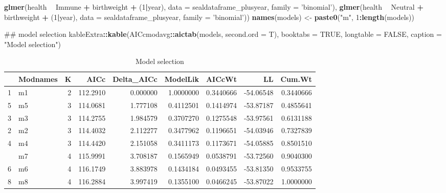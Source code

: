 \documentclass[]{article}
\newenvironment{Shaded}{\begin{snugshade}}{\end{snugshade}}
\newcommand{\KeywordTok}[1]{\textcolor[rgb]{0.13,0.29,0.53}{\textbf{#1}}}
\newcommand{\DataTypeTok}[1]{\textcolor[rgb]{0.13,0.29,0.53}{#1}}
\newcommand{\DecValTok}[1]{\textcolor[rgb]{0.00,0.00,0.81}{#1}}
\newcommand{\StringTok}[1]{\textcolor[rgb]{0.31,0.60,0.02}{#1}}
\newcommand{\OtherTok}[1]{\textcolor[rgb]{0.56,0.35,0.01}{#1}}
\newcommand{\OperatorTok}[1]{\textcolor[rgb]{0.81,0.36,0.00}{\textbf{#1}}}
\newcommand{\NormalTok}[1]{#1}
\begin{document}
\begin{Shaded}
\begin{Highlighting}[]
  \KeywordTok{glmer}\NormalTok{(health }\OperatorTok{~}\StringTok{  }\NormalTok{Immune }\OperatorTok{+}\StringTok{ }\NormalTok{birthweight }\OperatorTok{+}\StringTok{ }\NormalTok{(}\DecValTok{1}\OperatorTok{|}\NormalTok{year), }\DataTypeTok{data =}\NormalTok{ sealdataframe_plusyear, }\DataTypeTok{family =} \StringTok{'binomial'}\NormalTok{),}
  \KeywordTok{glmer}\NormalTok{(health }\OperatorTok{~}\StringTok{  }\NormalTok{Neutral }\OperatorTok{+}\StringTok{ }\NormalTok{birthweight }\OperatorTok{+}\StringTok{ }\NormalTok{(}\DecValTok{1}\OperatorTok{|}\NormalTok{year), }\DataTypeTok{data =}\NormalTok{ sealdataframe_plusyear, }\DataTypeTok{family =} \StringTok{'binomial'}\NormalTok{)) }
\KeywordTok{names}\NormalTok{(models) <-}\StringTok{ }\KeywordTok{paste0}\NormalTok{(}\StringTok{"m"}\NormalTok{, }\DecValTok{1}\OperatorTok{:}\KeywordTok{length}\NormalTok{(models))}

\NormalTok{## model selection}
\NormalTok{kableExtra}\OperatorTok{::}\KeywordTok{kable}\NormalTok{(AICcmodavg}\OperatorTok{::}\KeywordTok{aictab}\NormalTok{(models, }\DataTypeTok{second.ord =}\NormalTok{ T), }\DataTypeTok{booktabs =} \OtherTok{TRUE}\NormalTok{,}
                  \DataTypeTok{longtable =} \OtherTok{FALSE}\NormalTok{, }\DataTypeTok{caption =} \StringTok{"Model selection"}\NormalTok{)}
\end{Highlighting}
\end{Shaded}

\begin{table}

\caption{\label{tab:AIC models}Model selection}
\centering
\begin{tabular}[t]{llrrrrrrr}
\toprule
  & Modnames & K & AICc & Delta\_AICc & ModelLik & AICcWt & LL & Cum.Wt\\
\midrule
1 & m1 & 2 & 112.2910 & 0.000000 & 1.0000000 & 0.3440666 & -54.06548 & 0.3440666\\
5 & m5 & 3 & 114.0681 & 1.777108 & 0.4112501 & 0.1414974 & -53.87187 & 0.4855641\\
3 & m3 & 3 & 114.2755 & 1.984579 & 0.3707270 & 0.1275548 & -53.97561 & 0.6131188\\
2 & m2 & 3 & 114.4032 & 2.112277 & 0.3477962 & 0.1196651 & -54.03946 & 0.7327839\\
4 & m4 & 3 & 114.4420 & 2.151058 & 0.3411173 & 0.1173671 & -54.05885 & 0.8501510\\
\addlinespace
7 & m7 & 4 & 115.9991 & 3.708187 & 0.1565949 & 0.0538791 & -53.72560 & 0.9040300\\
6 & m6 & 4 & 116.1749 & 3.883978 & 0.1434184 & 0.0493455 & -53.81350 & 0.9533755\\
8 & m8 & 4 & 116.2884 & 3.997419 & 0.1355100 & 0.0466245 & -53.87022 & 1.0000000\\
\bottomrule
\end{tabular}
\end{table}
\end{document}
